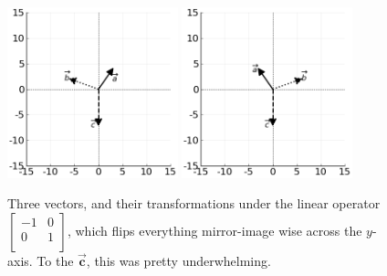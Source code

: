 \begin{figure}[ht]
\centering
\vspace{.2in}
\includegraphics[width=0.44\textwidth]{preoperators.png}
\includegraphics[width=0.44\textwidth]{horizFlipOp.png}
\caption[.]{Three vectors, and their transformations under the linear operator 
{\scriptsize $\begin{bmatrix} -1 & 0 \\ 0 & 1 \\
\end{bmatrix}$,} which flips everything mirror-image wise across the $y$-axis.
To the $\overrightarrow{\textbf{c}}$, this was pretty underwhelming.}
\label{fig:horizFlipOp}
\end{figure}

